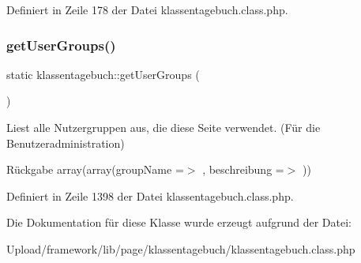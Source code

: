 Definiert in Zeile 178 der Datei klassentagebuch.\+class.\+php.

\mbox{\label{classklassentagebuch_ab896bf20c10c99bffd5e1f559d29e00b}} 
\subsubsection{\texorpdfstring{get\+User\+Groups()}{getUserGroups()}}
{\footnotesize\ttfamily static klassentagebuch\+::get\+User\+Groups (\begin{DoxyParamCaption}{ }\end{DoxyParamCaption})\hspace{0.3cm}{\ttfamily [static]}}

Liest alle Nutzergruppen aus, die diese Seite verwendet. (Für die Benutzeradministration) \begin{DoxyReturn}{Rückgabe}
array(array(\textquotesingle{}group\+Name\textquotesingle{} =$>$ \textquotesingle{}\textquotesingle{}, \textquotesingle{}beschreibung\textquotesingle{} =$>$ \textquotesingle{}\textquotesingle{})) 
\end{DoxyReturn}


Definiert in Zeile 1398 der Datei klassentagebuch.\+class.\+php.



Die Dokumentation für diese Klasse wurde erzeugt aufgrund der Datei\+:\begin{DoxyCompactItemize}
\item 
Upload/framework/lib/page/klassentagebuch/klassentagebuch.\+class.\+php\end{DoxyCompactItemize}
